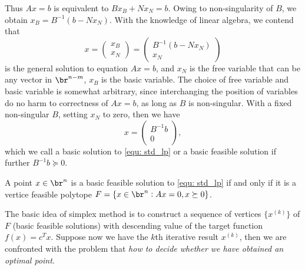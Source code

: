 Thus $Ax=b$ is equivalent to $Bx_B + Nx_N = b$. Owing to non-singularity of 
$B$, we obtain $x_B = B^{-1} (b - N x_N)$. With the knowledge of linear 
algebra, we contend that 
\begin{equation}
    x = \begin{pmatrix}
        x_B \\
        x_N
    \end{pmatrix}
    = \begin{pmatrix}
        B^{-1}(b - N x_N) \\
        x_N
    \end{pmatrix}
\end{equation}
is the general solution to equation $Ax = b$, and $x_N$ is the free 
variable that can be any vector in $\br^{n - m}$, $x_B$ is the basic 
variable. 
The choice of free variable and basic variable is somewhat arbitrary, 
since interchanging the position of variables do no harm to correctness of 
$Ax = b$, as long as $B$ is non-singular. 
With a fixed non-singular $B$, setting $x_N$ to zero, then we have 
\begin{equation}
    x = \begin{pmatrix}
        B^{-1}b \\
        0
    \end{pmatrix}, 
\end{equation}
which we call a basic solution to \ref{equ: std_lp} or a basic 
feasible solution if further $B^{-1}b \succeq 0$. 

\begin{thm}
A point $x \in \br^n$ is a basic feasible solution to \ref{equ: std_lp} 
if and only if it is a vertice feasible polytope $F = \{x \in \br^n: 
Ax = 0, x \succeq 0\}$.
\end{thm}

The basic idea of simplex method is to construct a sequence of vertices 
$\{x^{(k)}\}$ of $F$ (basic feasible solutions) with descending value of 
the target function $f(x) = c^T x$. 
Suppose now we have the $k$th iterative result $x^{(k)}$, then we are 
confronted with the problem that \emph{how to decide whether we have 
obtained an optimal point}. 

